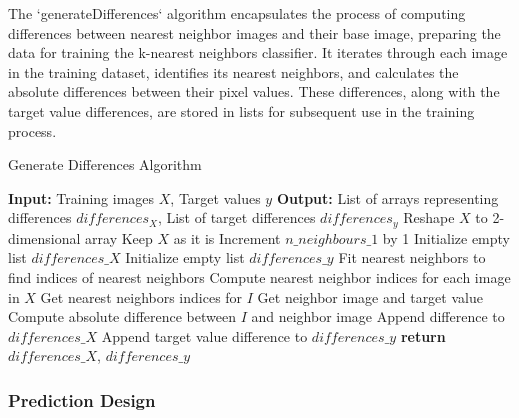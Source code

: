 \documentclass[a4paper, 12pt]{report}
\begin{document}
The `generateDifferences` algorithm encapsulates the process of computing differences between nearest neighbor images and their base image, 
preparing the data for training the k-nearest neighbors classifier. It iterates through each image in the training dataset, identifies its nearest neighbors, 
and calculates the absolute differences between their pixel values. These differences, along with the target value differences, are stored in lists 
for subsequent use in the training process.
\begin{algorithm}
    \caption{Generate Differences Algorithm}
    \label{alg:generate_image_differences}
    \begin{algorithmic}
            \State \textbf{Input:} Training images $X$, Target values $y$
            \State \textbf{Output:} List of arrays representing differences $differences_X$, List of target differences $differences_y$
                \State Reshape $X$ to 2-dimensional array
            \Else
                \State Keep $X$ as it is
            \EndIf
            \State Increment $n\_neighbours\_1$ by 1 
            \State Initialize empty list $differences\_X$
            \State Initialize empty list $differences\_y$
            \State Fit nearest neighbors to find indices of nearest neighbors
            \State Compute nearest neighbor indices for each image in $X$
                \State Get nearest neighbors indices for $I$
                    \State Get neighbor image and target value
                    \State Compute absolute difference between $I$ and neighbor image
                    \State Append difference to $differences\_X$
                    \State Append target value difference to $differences\_y$
                \EndFor
            \EndFor
            \State \textbf{return} $differences\_X$, $differences\_y$
        \EndFunction
    \end{algorithmic}
\end{algorithm}

\subsubsection{Prediction Design}
\end{document}
